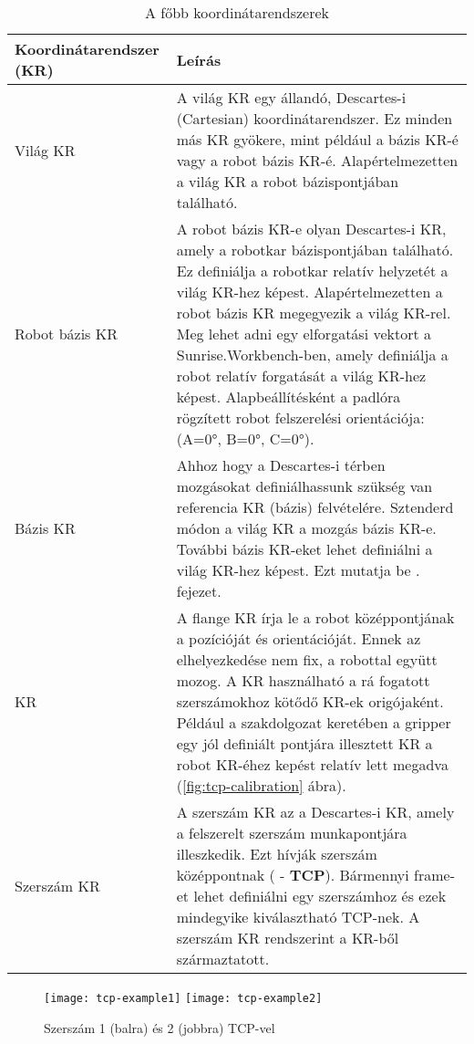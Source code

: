 \documentclass[../documentation.tex]{subfiles}
\begin{document}
\begin{table}[h]
\setlength\arrayrulewidth{1pt}
\begin{tabu} to\linewidth{| X[1.4,c,m] | X[3,l,m] |}
\hline
\rowfont{\bfseries\large} Koordinátarendszer (KR) & Leírás \\ \hline
Világ KR & A világ KR egy állandó, Descartes-i (Cartesian) koordinátarendszer. Ez minden más KR gyökere, mint például a bázis KR-é vagy a robot bázis KR-é. Alapértelmezetten a világ KR a robot bázispontjában található. \\ \hline
Robot bázis KR & A robot bázis KR-e olyan Descartes-i KR, amely a robotkar bázispontjában található. Ez definiálja a robotkar relatív helyzetét a világ KR-hez képest. Alapértelmezetten a robot bázis KR megegyezik a világ KR-rel. Meg lehet adni egy elforgatási vektort a Sunrise.Workbench-ben, amely definiálja a robot relatív forgatását a világ KR-hez képest. Alapbeállítésként a padlóra rögzített robot felszerelési orientációja: (A=0°, B=0°, C=0°).\\ \hline
Bázis KR & Ahhoz hogy a Descartes-i térben mozgásokat definiálhassunk szükség van referencia KR (bázis) felvételére. Sztenderd módon a világ KR a mozgás bázis KR-e. További bázis KR-eket lehet definiálni a világ KR-hez képest. Ezt mutatja be . fejezet. \\ \hline
{} KR & A flange KR írja le a robot  középpontjának a pozícióját és orientációját. Ennek az elhelyezkedése nem fix, a robottal együtt mozog. A  KR használható a rá fogatott szerszámokhoz kötődő KR-ek origójaként. Például a szakdolgozat keretében a gripper egy jól definiált pontjára illesztett KR a robot  KR-éhez kepést relatív lett megadva (\ref{fig:tcp-calibration} ábra). \\ \hline
Szerszám KR & A szerszám KR az a Descartes-i KR, amely a felszerelt szerszám munkapontjára illeszkedik. Ezt hívják szerszám középpontnak ( - \textbf{TCP}). Bármennyi frame-et lehet definiálni egy szerszámhoz és ezek mindegyike kiválasztható TCP-nek. A szerszám KR rendszerint a  KR-ből származtatott. \\ \hline
\end{tabu}
\caption{A főbb koordinátarendszerek}
\label{tab:coordsystems}
\end{table}

\begin{figure}
	\centering
	\texttt{[image: tcp-example1]}
	\texttt{[image: tcp-example2]}
	\caption{Szerszám 1 (balra) és 2 (jobbra) TCP-vel\cite{sunrisemanual}}
	\label{fig:tcp-examples}
\end{figure}
\end{document}
